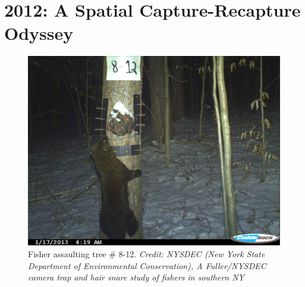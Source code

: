 \chapter{
2012: A Spatial Capture-Recapture Odyssey
}

\label{chapt.final}

\vspace{0.3cm}






\begin{figure}[h!]
\centering
\includegraphics[width=\textwidth]{Ch20-Last/fisher.jpg}
\caption{
Fisher assaulting tree \# 8-12.
{\it Credit: NYSDEC (New York State Department of Environmental Conservation),
A Fuller/NYSDEC camera trap and hair snare study of fishers in
southern NY}
}
\label{last.fig.fisher}
\end{figure}

